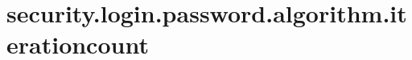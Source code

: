 \section{security.login.password.algorithm.iterationcount}
\label{configuration:SecurityLoginPasswordAlgorithmIterationcount}
\TODO
